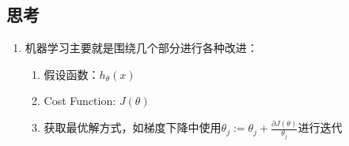 \subsection{思考}
{\color{red}{以下内容均为个人的思考，不一定是正确的。}}
\begin{enumerate}
	\item 机器学习主要就是围绕几个部分进行各种改进：
	\begin{enumerate}
		\item 假设函数：$h_\theta(x)$
		\item Cost Function: $J(\theta)$
		\item 获取最优解方式，如梯度下降中使用$\theta_j := \theta_j + \frac{\partial J(\theta)}{\theta_j}$进行迭代

	\end{enumerate}
\end{enumerate}
















